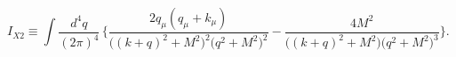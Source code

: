 \begin{equation}
I_{X2} \equiv
\int\frac{d^4q}{(2\pi)^4}\,
\Bigg\{\frac{2 q_\mu (q_\mu+k_\mu)}{\Big((k+q)^2+M^2\Big)^2
\Big(q^2+M^2\Big)^2} - \frac{4 M^2}{\Big((k+q)^2+M^2\Big)
\Big(q^2+M^2\Big)^3} \Bigg\}.\qquad
\end{equation}

